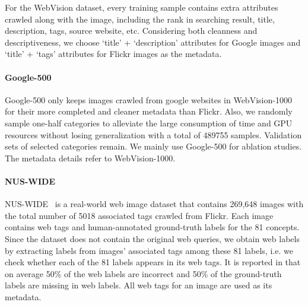 \documentclass[sigconf]{acmart}
\begin{document}
For the WebVision dataset, every training sample contains extra attributes crawled along with the image, including the rank in searching result, title, description, tags, source website, etc. Considering both cleanness and descriptiveness, we choose `title' + `description' attributes for Google images and `title' + `tags' attributes for Flickr images as the metadata.

\paragraph{Google-500} Google-500 only keeps images crawled from google websites in WebVision-1000 for their more completed and cleaner metadata than Flickr. Also, we randomly sample one-half categories to alleviate the large consumption of time and GPU resources without losing generalization with a total of 489755 samples. Validation sets of selected categories remain. We mainly use Google-500 for ablation studies.
The metadata details refer to WebVision-1000. 

\paragraph{NUS-WIDE} NUS-WIDE~\cite{nus-wide-civr09} is a real-world web image dataset that contains 269,648 images with the total number of 5018 associated tags crawled from Flickr. Each image contains web tags and human-annotated ground-truth labels for the 81 concepts. Since the dataset does not contain the original web queries, we obtain web labels by extracting labels from images’ associated tags among these 81 labels, i.e. we check whether each of the 81 labels appears in its web tags. It is reported in \cite{nus-wide-civr09} that on average 50\% of the web labels are incorrect and 50\% of the ground-truth labels are missing in web labels. All web tags for an image are used as its metadata. 
\end{document}

